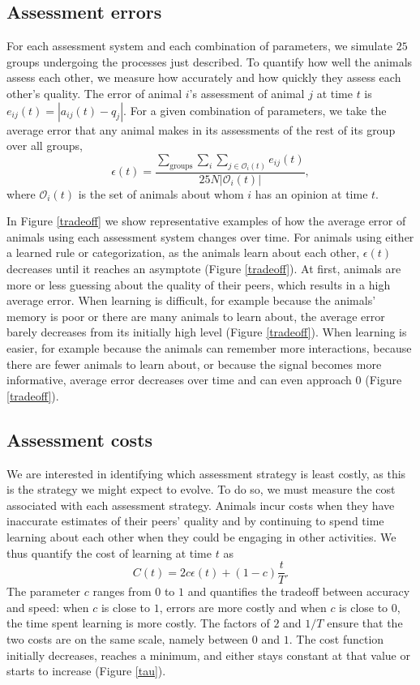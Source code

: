 \subsection{Assessment errors }
For each assessment system and each combination of parameters, we simulate $25$ groups undergoing the processes just described.  To quantify how well the animals assess each other, we measure how accurately and how quickly they assess each other's quality. The error of animal $i$'s assessment of animal $j$ at time $t$ is $e_{ij}(t)=|a_{ij}(t)-q_j|$. For a given combination of parameters, we take the average error that any animal makes in its assessments of the rest of its group over all groups, 
\begin{equation*}
\epsilon(t) = \frac{\sum_{\text{groups}}\sum_i\sum_{j\in \mathscr{O}_i(t)}e_{ij}(t)}{25N|\mathscr{O}_i(t)|},
\end{equation*}
where $\mathscr{O}_i(t)$ is the set of animals about whom $i$ has an opinion at time $t$.

In Figure \ref{tradeoff} we show representative examples of how the average error of animals using each assessment system changes over time.  For animals using either a learned rule or categorization, as the animals learn about each other, $\epsilon(t)$ decreases until it reaches an asymptote (Figure \ref{tradeoff}). At first, animals are more or less guessing about the quality of their peers, which results in a high average error. When learning is difficult, for example because the animals' memory is poor or there are many animals to learn about, the average error barely decreases from its initially high level (Figure \ref{tradeoff}). When learning is easier, for example because the animals can remember more interactions, because there are fewer animals to learn about, or because the signal becomes more informative, average error decreases over time and can even approach $0$ (Figure \ref{tradeoff}).  

\subsection{Assessment costs }
We are interested in identifying which assessment strategy is least costly, as this is the strategy we might expect to evolve. To do so, we must measure the cost associated with each assessment strategy. Animals incur costs when they have inaccurate estimates of their peers' quality and by continuing to spend time learning about each other when they could be engaging in other activities. We thus quantify the cost of learning at time $t$ as 
\begin{equation*}
C(t) = 2c\epsilon(t) +(1-c)\frac{t}{T}.
\end{equation*}  
The parameter $c$ ranges from $0$ to $1$ and quantifies the tradeoff between accuracy and speed: when $c$ is close to $1$, errors are more costly and when $c$ is close to $0$, the time spent learning is more costly. The factors of $2$ and $1/T$ ensure that the two costs are on the same scale, namely between $0$ and $1$. 
The cost function initially decreases, reaches a minimum, and either stays constant at that value or starts to increase (Figure \ref{tau}). 

